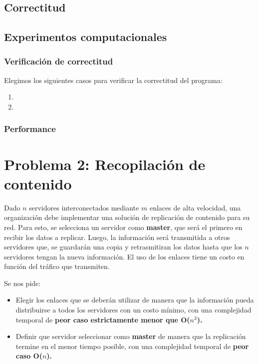 \documentclass[a4paper, 10pt, twoside]{article}
\begin{document}
\subsection{Correctitud}

\subsection{Experimentos computacionales}
\subsubsection{Verificación de correctitud}

Elegimos los siguientes casos para verificar la correctitud del programa:

\begin{enumerate}
\item{}
\item{}
\end{enumerate}
\subsubsection{Performance}





\newpage

\section{Problema 2: Recopilación de contenido}

Dado $n$ servidores interconectados mediante $m$ enlaces de alta velocidad, una organización debe implementar una solución de replicación de contenido para su red. Para esto, se selecciona un servidor como \textbf{master}, que será el primero en recibir los datos a replicar. Luego, la información será transmitida a otros servidores que, se guardarán una copia y retrasmitiran los datos hasta que los $n$ servidores tengan la nueva información. El uso de los enlaces tiene un costo en función del tráfico que transmiten.

Se nos pide:
\begin{itemize}
    \item{Elegir los enlaces que se deberán utilizar de manera que la información pueda distribuirse a todos los servidores con un costo mínimo, con una complejidad temporal de \textbf{peor caso estrictamente menor que O($n^3$).}}
    \item{Definir que servidor seleccionar como \textbf{master} de manera que la replicación termine en el menor tiempo posible, con una complejidad temporal de \textbf{peor caso O($n$).}}
\end{itemize}
\end{document}
